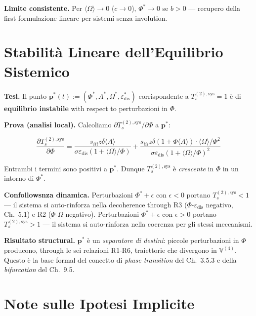 \Proved{} \textbf{Limite consistente.} Per
\(\langle\Omega\rangle \to 0\) (\(c \to 0\)), \(\Phi^* \to 0\) se
\(b > 0\) --- recupero della first formulazione lineare per sistemi
senza involution.



\section{Stabilità Lineare dell'Equilibrio
Sistemico}\label{stabilituxe0-lineare-dellequilibrio-sistemico}

\Hypoth{} \textbf{Tesi.} Il punto
\(\boldsymbol{p}^*(t) := (\Phi^*, A^*, \Omega^*, \varepsilon_{\text{dis}}^*)\)
corrispondente a \(T_s^{(2),\text{sys}} = 1\) è di \textbf{equilibrio
instabile} with respect to perturbazioni in \(\Phi\).

\Proved{} \textbf{Prova (analisi local).} Calcoliamo
\(\partial T_s^{(2),\text{sys}} / \partial \Phi\) a
\(\boldsymbol{p}^*\):

\[
\frac{\partial T_s^{(2),\text{sys}}}{\partial \Phi} = \frac{s_{iii}z\delta\langle A\rangle}{\sigma\varepsilon_{\text{dis}}(1+\langle\Omega\rangle/\Phi)} + \frac{s_{iii}z\delta(1+\Phi\langle A\rangle) \cdot \langle\Omega\rangle/\Phi^2}{\sigma\varepsilon_{\text{dis}}(1+\langle\Omega\rangle/\Phi)^2}
\]

Entrambi i termini sono positivi a \(\boldsymbol{p}^*\). Dunque
\(T_s^{(2),\text{sys}}\) è \emph{crescente} in \(\Phi\) in un intorno di
\(\Phi^*\).

\Hypoth{} \textbf{Confollowsnza dinamica.} Perturbazioni
\(\Phi^* + \epsilon\) con \(\epsilon < 0\) portano
\(T_s^{(2),\text{sys}} < 1\) --- il sistema si auto-rinforza nella
decoherence through R3 (\(\Phi\)-\(\varepsilon_{\text{dis}}\) negativo,
Ch.~5.1) e R2 (\(\Phi\)-\(\Omega\) negativo). Perturbazioni
\(\Phi^* + \epsilon\) con \(\epsilon > 0\) portano
\(T_s^{(2),\text{sys}} > 1\) --- il sistema si auto-rinforza nella
coerenza per gli stessi meccanismi.

\Proved{} \textbf{Risultato structural.} \(\boldsymbol{p}^*\) è un
\emph{separatore di destini}: piccole perturbazioni in \(\Phi\)
producono, through le sei relazioni R1-R6, traiettorie che divergono
in \(\mathbb{V}^{(4)}\). Questo è la base formal del concetto di
\emph{phase transition} del Ch.~3.5.3 e della \emph{bifurcation}
del Ch.~9.5.



\section{Note sulle Ipotesi
Implicite}\label{note-sulle-hypothesis-implicite}

